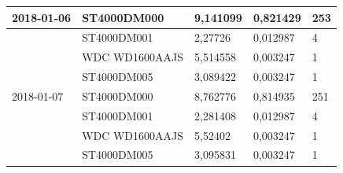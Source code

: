 \documentclass{VUMIFPSkursinis}
\begin{document}
\begin{table}[H]
{\begin{tabular}{|l|l|l|l|l|}
2018-01-06                          & ST4000DM000                           & 9,141099                               & 0,821429                             & 253                                  \\ \hline
\cellcolor[HTML]{C0C0C0}            & ST4000DM001                           & 2,27726                                & 0,012987                             & 4                                    \\ \hline
\cellcolor[HTML]{C0C0C0}            & WDC WD1600AAJS                        & 5,514558                               & 0,003247                             & 1                                    \\ \hline
\cellcolor[HTML]{C0C0C0}            & ST4000DM005                           & 3,089422                               & 0,003247                             & 1                                    \\ \hline
2018-01-07                          & ST4000DM000                           & 8,762776                               & 0,814935                             & 251                                  \\ \hline
\cellcolor[HTML]{C0C0C0}            & ST4000DM001                           & 2,281408                               & 0,012987                             & 4                                    \\ \hline
\cellcolor[HTML]{C0C0C0}            & WDC WD1600AAJS                        & 5,52402                                & 0,003247                             & 1                                    \\ \hline
\cellcolor[HTML]{C0C0C0}            & ST4000DM005                           & 3,095831                               & 0,003247                             & 1                                    \\ \hline
\end{tabular}}
\end{table}
\end{document}
